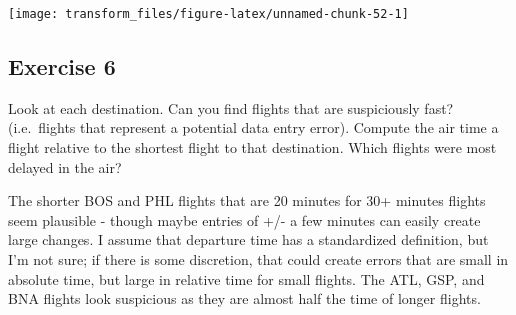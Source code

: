 \documentclass[]{book}
\newenvironment{Shaded}{\begin{snugshade}}{\end{snugshade}}
\newcommand{\CommentTok}[1]{\textcolor[rgb]{0.56,0.35,0.01}{\textit{#1}}}
\newcommand{\DataTypeTok}[1]{\textcolor[rgb]{0.13,0.29,0.53}{#1}}
\newcommand{\KeywordTok}[1]{\textcolor[rgb]{0.13,0.29,0.53}{\textbf{#1}}}
\newcommand{\NormalTok}[1]{#1}
\newcommand{\OperatorTok}[1]{\textcolor[rgb]{0.81,0.36,0.00}{\textbf{#1}}}
\newcommand{\StringTok}[1]{\textcolor[rgb]{0.31,0.60,0.02}{#1}}
\theoremstyle{definition}
\theoremstyle{definition}
\theoremstyle{definition}
\theoremstyle{remark}
\begin{document}
\begin{Shaded}
\end{Shaded}

\begin{center}\texttt{[image: transform\_files/figure-latex/unnamed-chunk-52-1]} \end{center}

\hypertarget{exercise-6-2}{%
\subsection{Exercise 6}\label{exercise-6-2}}

Look at each destination. Can you find flights that are suspiciously
fast? (i.e.~flights that represent a potential data entry error).
Compute the air time a flight relative to the shortest flight to that
destination. Which flights were most delayed in the air?

The shorter BOS and PHL flights that are 20 minutes for 30+ minutes
flights seem plausible - though maybe entries of +/- a few minutes can
easily create large changes. I assume that departure time has a
standardized definition, but I'm not sure; if there is some discretion,
that could create errors that are small in absolute time, but large in
relative time for small flights. The ATL, GSP, and BNA flights look
suspicious as they are almost half the time of longer flights.
\end{document}
